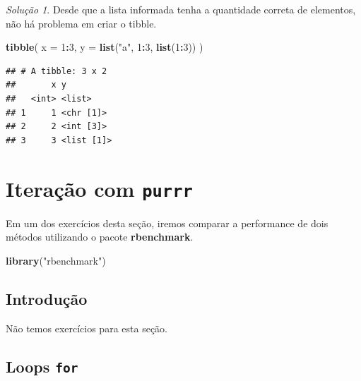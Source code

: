 \documentclass[
]{latex/krantz}
\newenvironment{Shaded}{\begin{snugshade}}{\end{snugshade}}
\newcommand{\AttributeTok}[1]{\textcolor[rgb]{0.13,0.29,0.53}{#1}}
\newcommand{\DecValTok}[1]{\textcolor[rgb]{0.00,0.00,0.81}{#1}}
\newcommand{\FunctionTok}[1]{\textcolor[rgb]{0.13,0.29,0.53}{\textbf{#1}}}
\newcommand{\NormalTok}[1]{#1}
\newcommand{\SpecialCharTok}[1]{\textcolor[rgb]{0.81,0.36,0.00}{\textbf{#1}}}
\newcommand{\StringTok}[1]{\textcolor[rgb]{0.31,0.60,0.02}{#1}}
\theoremstyle{definition}
\theoremstyle{definition}
\theoremstyle{definition}
\theoremstyle{definition}
\theoremstyle{remark}
\newtheorem*{solution}{Solução}
\begin{document}
\begin{solution}

Desde que a lista informada tenha a quantidade correta de elementos, não há problema em criar o tibble.

\begin{Shaded}
\begin{Highlighting}[]
\FunctionTok{tibble}\NormalTok{(}
  \AttributeTok{x =} \DecValTok{1}\SpecialCharTok{:}\DecValTok{3}\NormalTok{,}
  \AttributeTok{y =} \FunctionTok{list}\NormalTok{(}\StringTok{"a"}\NormalTok{, }\DecValTok{1}\SpecialCharTok{:}\DecValTok{3}\NormalTok{, }\FunctionTok{list}\NormalTok{(}\DecValTok{1}\SpecialCharTok{:}\DecValTok{3}\NormalTok{))}
\NormalTok{)}
\end{Highlighting}
\end{Shaded}

\begin{verbatim}
## # A tibble: 3 x 2
##       x y         
##   <int> <list>    
## 1     1 <chr [1]> 
## 2     2 <int [3]> 
## 3     3 <list [1]>
\end{verbatim}

\end{solution}

\hypertarget{iterauxe7uxe3o-com-purrr}{%
\chapter{\texorpdfstring{Iteração com \texttt{purrr}}{Iteração com purrr}}\label{iterauxe7uxe3o-com-purrr}}

Em um dos exercícios desta seção, iremos comparar a performance de dois métodos utilizando o pacote \textbf{rbenchmark}.

\begin{Shaded}
\begin{Highlighting}[]
\FunctionTok{library}\NormalTok{(}\StringTok{"rbenchmark"}\NormalTok{)}
\end{Highlighting}
\end{Shaded}

\hypertarget{introduuxe7uxe3o-13}{%
\section{Introdução}\label{introduuxe7uxe3o-13}}

Não temos exercícios para esta seção.

\hypertarget{loops-for}{%
\section{\texorpdfstring{Loops \texttt{for}}{Loops for}}\label{loops-for}}
\end{document}
